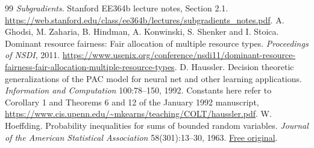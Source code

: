 \documentclass[11pt]{article}
\theoremstyle{definition}\newtheorem{definition}[theorem]{Definition}
\theoremstyle{remark}\newtheorem{remark}[theorem]{Remark}
\begin{document}
\begin{thebibliography}{99}
\emph{Subgradients}. Stanford EE364b lecture notes, Section 2.1.
\url{https://web.stanford.edu/class/ee364b/lectures/subgradients_notes.pdf}.
A. Ghodsi, M. Zaharia, B. Hindman, A. Konwinski, S. Shenker and I. Stoica.
Dominant resource fairness: Fair allocation of multiple resource types.
\emph{Proceedings of NSDI}, 2011.
\url{https://www.usenix.org/conference/nsdi11/dominant-resource-fairness-fair-allocation-multiple-resource-types}.
D. Haussler. Decision theoretic generalizations of the PAC model for neural
net and other learning applications.
\emph{Information and Computation} 100:78--150, 1992.
Constants here refer to Corollary 1 and Theorems 6 and 12 of the January 1992 manuscript,
\url{https://www.cis.upenn.edu/~mkearns/teaching/COLT/haussler.pdf}.
W. Hoeffding. Probability inequalities for sums of bounded random variables.
\emph{Journal of the American Statistical Association} 58(301):13--30, 1963.
\href{https://www.cs.rpi.edu/academics/courses/spring06/random/hoefding.pdf}{Free original}.

\end{thebibliography}
\end{document}
